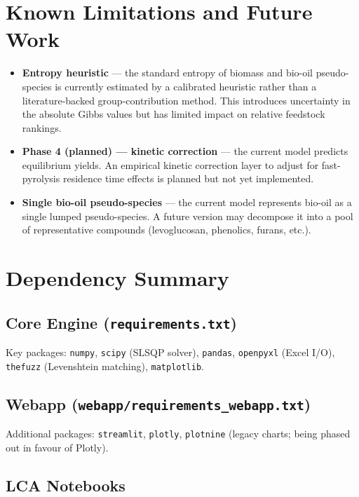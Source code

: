 \documentclass[12pt, a4paper]{article}
\begin{document}
\section{Known Limitations and Future Work}

\begin{itemize}
    \item \textbf{Entropy heuristic} — the standard entropy of biomass and bio-oil pseudo-species is currently estimated by a calibrated heuristic rather than a literature-backed group-contribution method. This introduces uncertainty in the absolute Gibbs values but has limited impact on relative feedstock rankings.
    \item \textbf{Phase 4 (planned) — kinetic correction} — the current model predicts equilibrium yields. An empirical kinetic correction layer to adjust for fast-pyrolysis residence time effects is planned but not yet implemented.
    \item \textbf{Single bio-oil pseudo-species} — the current model represents bio-oil as a single lumped pseudo-species. A future version may decompose it into a pool of representative compounds (levoglucosan, phenolics, furans, etc.).
\end{itemize}

\section{Dependency Summary}

\subsection{Core Engine (\texttt{requirements.txt})}

Key packages: \texttt{numpy}, \texttt{scipy} (SLSQP solver), \texttt{pandas}, \texttt{openpyxl} (Excel I/O), \texttt{thefuzz} (Levenshtein matching), \texttt{matplotlib}.

\subsection{Webapp (\texttt{webapp/requirements\_webapp.txt})}

Additional packages: \texttt{streamlit}, \texttt{plotly}, \texttt{plotnine} (legacy charts; being phased out in favour of Plotly).

\subsection{LCA Notebooks}
\end{document}
